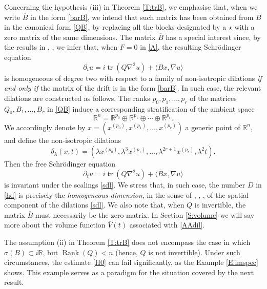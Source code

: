 \documentclass[11pt,letter]{amsart}
\def \R {\mathbb{R}}
\newcommand{\Rn}{\mathbb R^n}
\newcommand{\p}{\partial}
\numberwithin{equation}{section}
\numberwithin{equation}{section}
\begin{document}
\vskip 0.2in

\noindent Concerning the hypothesis (iii) in Theorem \ref{T:trB}, we emphasise that, when we write  $\overline B$ in the form \eqref{barB}, we intend that such matrix has been obtained from $B$ in the canonical form \eqref{QB}, by replacing all the blocks designated by a $\star$ with a zero matrix of the same dimensions. The matrix $\overline B$ has a special interest since, by the results in \cite{Ku,Ku2}, \cite{LP}, we infer that, when $F = 0$ in \eqref{A}, the resulting  Schr\"odinger equation
\begin{equation}\label{AA}
\p_t u = i \operatorname{tr}(Q \nabla^2 u) +  \langle B x,\nabla u\rangle 
\end{equation}
 is homogeneous of degree two with respect to a family of non-isotropic dilations \emph{if and only if} the matrix of the drift is in the form \eqref{barB}. In such case, the relevant dilations are constructed as follows. The ranks $p_0, p_1,...,p_r$ of the matrices $Q_0, B_1,...,B_r$ in \eqref{QB} induce a corresponding stratification of the ambient space 
\[
\Rn=\R^{p_0}\oplus\R^{p_1}\oplus\cdots\oplus\R^{p_r}.
\]
We accordingly denote by $x=\left(x^{(p_0)},x^{(p_1)},\ldots,x^{(p_r)}\right)$ a generic point of $\Rn$, and define the non-isotropic dilations  
\begin{equation}\label{sdl}
\delta_\lambda(x,t) = \left(\lambda
x^{(p_0)},\lambda^3
x^{(p_1)},\ldots,\lambda^{2r+1}x^{(p_r)},\lambda^2t\right).
\end{equation}
Then the free Schr\"odinger equation 
\begin{equation}\label{AAdil}
\p_t u = i \operatorname{tr}(Q \nabla^2 u) +  \langle \overline B x,\nabla u\rangle 
\end{equation}
is invariant under the scalings \eqref{sdl}. We stress that, in such case, the number $D$ in \eqref{hd} is precisely the \emph{homogeneous dimension}, in the sense of \cite{FS}, \cite{RS}, \cite{NSW}, of the spatial component of the dilations \eqref{sdl}. We also note that, when $Q$ is invertible, the matrix $\overline B$ must necessarily be the zero matrix. 
In Section \ref{S:volume} we will say more about the volume function $\overline V(t)$ associated with \eqref{AAdil}.

\vskip 0.2in

The assumption (ii) in Theorem \ref{T:trB} does not encompass the case in which $\sigma(B) \subset i \R$, but $\operatorname{Rank}(Q)<n$ (hence, $Q$ is not invertible). Under such circumstances, the estimate \eqref{H0} can fail significantly, as the Example \ref{E:imspec} shows. This example serves as a paradigm for the situation covered by the next result. 
\end{document}
